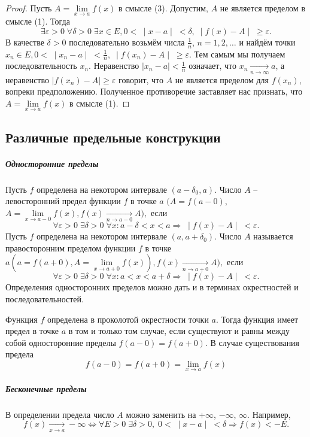 \begin{proof}
Пусть $A=\lim\limits_{x \to a} f(x)$ в смысле (3). Допустим, $A$ не является пределом в смысле (1). Тогда
$$\exists\varepsilon > 0 \; \forall \delta > 0 \; \exists x \in E, 0 < \;  \mid x - a \mid \; < \delta, \; \mid f(x) - A \mid \; \geq \varepsilon.$$
В качестве $\delta > 0 $ последовательно возьмём числа $\frac1{n}$, $n = 1, 2, \ldots$ и найдём точки $x_n \in E, 0 < \; \mid x_n - a \mid \; < \frac1{n}, \; \mid f(x_n) - A \mid \; \geq \varepsilon$. Тем самым мы получаем последовательность ${x_n}$. Неравенство $\mid x_n - a \mid < \frac1{n} $ означает, что $x_n \xrightarrow[n\rightarrow\infty]{} a$, а неравенство $\mid f(x_n) - A \mid \geq \varepsilon$ говорит, что $A$ не является пределом для ${f(x_n)}$, вопреки предположению. Полученное противоречие заставляет нас признать, что $A=\lim\limits_{x \to a} f(x)$ в смысле (1).
\end{proof}
\subsection{Различные предельные конструкции}
\subparagraph{Односторонние пределы}
Пусть $f$ определена на некотором интервале $(a - \delta_0, a)$.
Число $A$ -- левосторонний предел функции $f$ в точке $a$ $(A = f(a - 0)$, $A=\lim\limits_{x \to a - 0} f(x), f(x) \xrightarrow[n\rightarrow a-0]{} A),$ если
$$ \forall \varepsilon > 0 \; \exists \delta > 0 \; \forall x: a - \delta < x < a \Rightarrow \; \mid f(x) - A \mid \; < \varepsilon.$$
Пусть $f$ определена на некотором интервале $(a, a + \delta_0)$.
Число $A$ называется правосторонним пределом функции $f$ в точке $a (a = f(a+0), A=\lim\limits_{x \to a+0} f(x)), f(x) \xrightarrow[n\rightarrow a+0]{} A),$ если
$$ \forall \varepsilon > 0 \; \exists \delta > 0 \; \forall x: a < x < a + \delta \Rightarrow \; \mid f(x) - A \mid \; < \varepsilon.$$
Определения односторонних пределов можно дать и в терминах окрестностей и последовательностей.
\begin{Proposition}
Функция $f$ определена в проколотой окрестности точки $a$.
Тогда функция имеет предел в точке $a$ в том и только том случае, если существуют и равны между собой односторонние пределы $f(a-0) = f(a+0).$ В случае существования предела
$$f(a-0) = f(a+0) = \lim\limits_{x \to a} f(x)$$
\end{Proposition}

\subparagraph{Бесконечные пределы}
В определении предела число $A$ можно заменить на $+\infty$, $-\infty$, $\infty$. Например,
$$f(x) \xrightarrow[x\rightarrow a]{} -\infty \Leftrightarrow \forall E > 0 \; \exists \delta > 0, \; 0 < \; \mid x - a \mid \; < \delta \Rightarrow f(x) < -E.$$

